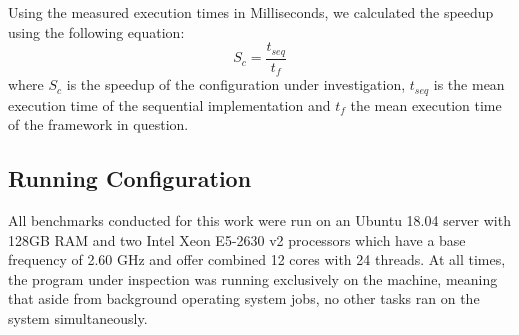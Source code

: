 Using the measured execution times in Milliseconds, we calculated the speedup using the following equation:
\[
    S_c = \frac{t_{seq}}{t_f}
\]
where $S_c$ is the speedup of the configuration under investigation, $t_{seq}$ is the mean execution time of the sequential implementation and $t_f$ the mean execution time of the framework in question.

\subsection{Running Configuration}
\label{sec:experiments:measurements:hardware}

All benchmarks conducted for this work were run on an Ubuntu 18.04 server with 128GB RAM and two Intel Xeon E5-2630 v2 processors which have a base frequency of 2.60 GHz and offer combined 12 cores with 24 threads.
At all times, the program under inspection was running exclusively on the machine, meaning that aside from background operating system jobs, no other tasks ran on the system simultaneously.


